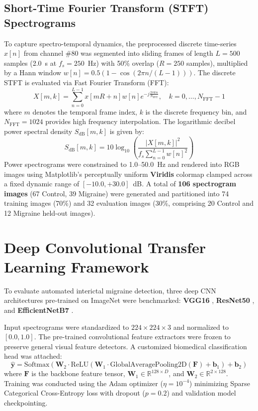 \documentclass[12pt, a4paper]{report}
\begin{document}
\subsection{Short-Time Fourier Transform (STFT) Spectrograms}
To capture spectro-temporal dynamics, the preprocessed discrete time-series $x[n]$ from channel \#80 was segmented into sliding frames of length $L = 500$ samples (2.0~s at $f_s = 250$~Hz) with 50\% overlap ($R = 250$ samples), multiplied by a Hann window $w[n] = 0.5(1 - \cos(2\pi n / (L-1)))$. The discrete STFT is evaluated via Fast Fourier Transform (FFT):
\begin{equation}
    X[m, k] = \sum_{n=0}^{L-1} x[mR + n] w[n] e^{-j \frac{2\pi k n}{N_{\text{FFT}}}}, \quad k = 0, \dots, N_{\text{FFT}}-1
    \label{eq:stft_discrete}
\end{equation}
where $m$ denotes the temporal frame index, $k$ is the discrete frequency bin, and $N_{\text{FFT}} = 1024$ provides high frequency interpolation. The logarithmic decibel power spectral density $S_{\text{dB}}[m, k]$ is given by:
\begin{equation}
    S_{\text{dB}}[m, k] = 10 \log_{10} \left( \frac{|X[m, k]|^2}{f_s \sum_{n=0}^{L-1} w[n]^2} \right)
    \label{eq:psd_db}
\end{equation}
Power spectrograms were constrained to 1.0--50.0~Hz and rendered into RGB images using Matplotlib's perceptually uniform \textbf{Viridis} colormap clamped across a fixed dynamic range of $[-10.0, +30.0]$~dB. A total of \textbf{106 spectrogram images} (67 Control, 39 Migraine) were generated and partitioned into 74 training images (70\%) and 32 evaluation images (30\%, comprising 20 Control and 12 Migraine held-out images).

\section{Deep Convolutional Transfer Learning Framework}
\label{sec:deep_learning_models}
To evaluate automated interictal migraine detection, three deep CNN architectures pre-trained on ImageNet were benchmarked: \textbf{VGG16} \cite{Simonyan2014}, \textbf{ResNet50} \cite{He2016}, and \textbf{EfficientNetB7} \cite{Tan2019}.

Input spectrograms were standardized to $224 \times 224 \times 3$ and normalized to $[0.0, 1.0]$. The pre-trained convolutional feature extractors were frozen to preserve general visual feature detectors. A customized biomedical classification head was attached:
\begin{equation}
    \hat{\mathbf{y}} = \text{Softmax}\left(\mathbf{W}_2 \cdot \text{ReLU}(\mathbf{W}_1 \cdot \text{GlobalAveragePooling2D}(\mathbf{F}) + \mathbf{b}_1) + \mathbf{b}_2\right)
    \label{eq:classification_head}
\end{equation}
where $\mathbf{F}$ is the backbone feature tensor, $\mathbf{W}_1 \in \mathbb{R}^{128 \times D}$, and $\mathbf{W}_2 \in \mathbb{R}^{2 \times 128}$. Training was conducted using the Adam optimizer ($\eta = 10^{-4}$) minimizing Sparse Categorical Cross-Entropy loss with dropout ($p = 0.2$) and validation model checkpointing.
\end{document}
